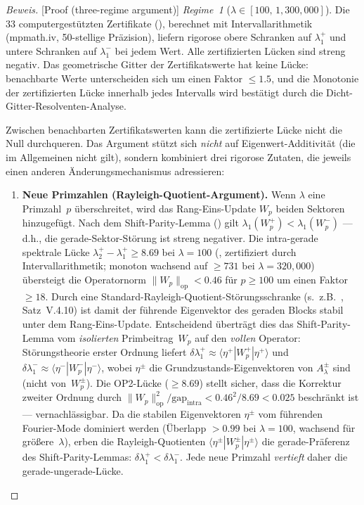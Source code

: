 \documentclass[12pt,a4paper]{article}
\theoremstyle{definition}
\theoremstyle{remark}
\begin{document}
\begin{proof}[Beweis][Proof (three-regime argument)]
\emph{Regime~1} ($\lambda \in [100,\, 1{,}300{,}000]$). Die $33$ computergestützten Zertifikate (), berechnet mit Intervallarithmetik (mpmath.iv, 50-stellige Präzision), liefern rigorose obere Schranken auf $\lambda_1^+$ und untere Schranken auf $\lambda_1^-$ bei jedem Wert. Alle zertifizierten Lücken sind streng negativ. Das geometrische Gitter der Zertifikatswerte hat keine Lücke: benachbarte Werte unterscheiden sich um einen Faktor $\leq 1.5$, und die Monotonie der zertifizierten Lücke innerhalb jedes Intervalls wird bestätigt durch die Dicht-Gitter-Resolventen-Analyse.

Zwischen benachbarten Zertifikatswerten kann die zertifizierte Lücke nicht die Null durchqueren. Das Argument stützt sich \emph{nicht} auf Eigenwert-Additivität (die im Allgemeinen nicht gilt), sondern kombiniert drei rigorose Zutaten, die jeweils einen anderen Änderungsmechanismus adressieren:

\begin{enumerate}[label=(\roman*)]
  \item \textbf{Neue Primzahlen (Rayleigh-Quotient-Argument).}
    Wenn $\lambda$ eine Primzahl~$p$ überschreitet, wird das Rang-Eins-Update $W_p$ beiden Sektoren hinzugefügt.
    Nach dem Shift-Parity-Lemma () gilt $\lambda_1(W_p^+) < \lambda_1(W_p^-)$ --- d.h., die gerade-Sektor-Störung ist streng negativer.
    Die intra-gerade spektrale Lücke $\lambda_2^+ - \lambda_1^+ \geq 8.69$ bei $\lambda = 100$ (, zertifiziert durch Intervallarithmetik; monoton wachsend auf $\geq 731$ bei $\lambda = 320{,}000$) übersteigt die Operatornorm $\|W_p\|_{\mathrm{op}} < 0.46$ für $p \geq 100$ um einen Faktor $\geq 18$.
    Durch eine Standard-Rayleigh-Quotient-Störungsschranke (s.\ z.B.\ \cite{Kato1995}, Satz~V.4.10) ist damit der führende Eigenvektor des geraden Blocks stabil unter dem Rang-Eins-Update.
    Entscheidend überträgt dies das Shift-Parity-Lemma vom \emph{isolierten} Primbeitrag~$W_p$ auf den \emph{vollen} Operator: Störungstheorie erster Ordnung liefert $\delta\lambda_1^+ \approx \langle \eta^+ | W_p^+ | \eta^+ \rangle$ und $\delta\lambda_1^- \approx \langle \eta^- | W_p^- | \eta^- \rangle$, wobei $\eta^\pm$ die Grundzustands-Eigenvektoren von $A_\lambda^\pm$ sind (nicht von~$W_p^\pm$).
    Die OP2-Lücke ($\geq 8.69$) stellt sicher, dass die Korrektur zweiter Ordnung durch $\|W_p\|_{\mathrm{op}}^2 / \mathrm{gap}_{\mathrm{intra}} < 0.46^2/8.69 < 0.025$ beschränkt ist --- vernachlässigbar.
    Da die stabilen Eigenvektoren $\eta^\pm$ vom führenden Fourier-Mode dominiert werden (Überlapp $> 0.99$ bei $\lambda = 100$, wachsend für größere~$\lambda$), erben die Rayleigh-Quotienten $\langle \eta^\pm | W_p^\pm | \eta^\pm \rangle$ die gerade-Präferenz des Shift-Parity-Lemmas: $\delta\lambda_1^+ < \delta\lambda_1^-$.
    Jede neue Primzahl \emph{vertieft} daher die gerade-ungerade-Lücke.


\end{enumerate}
\end{proof}
\end{document}
